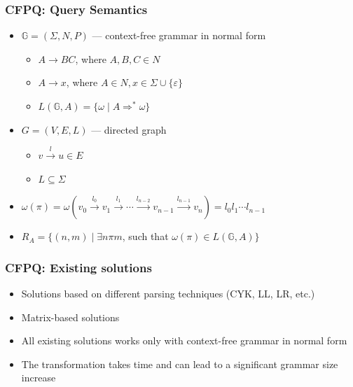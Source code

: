 \documentclass[xcolor=table]{beamer}
\begin{document}
  \begin{frame}[fragile]
    \frametitle{CFPQ: Query Semantics}
    \begin{itemize}
      \item $\mathbb{G} = (\Sigma, N, P)$ --- context-free grammar in normal form
      \begin{itemize}
        \item $A \rightarrow B C$, where $A, B, C \in N$
        \item $A \rightarrow x$, where $A \in N, x \in \Sigma \cup \{\varepsilon\}$
        \item $L(\mathbb{G},A) = \{ \omega \mid A \Rightarrow^* \omega \}$
      \end{itemize}
      \pause
      \item $G = (V,E,L)$ --- directed graph
        \begin{itemize}
          \item $v \xrightarrow{l} u \in E$
          \item $L \subseteq \Sigma$
        \end{itemize}
        \pause
      \item $\omega(\pi) = \omega(v_0 \xrightarrow{l_0} v_1 \xrightarrow{l_1} \cdots \xrightarrow{l_{n-2}} v_{n-1} \xrightarrow{l_{n-1}} v_n) = l_0 l_1 \cdots l_{n-1}$
      \pause
      \item $R_A = \{ (n, m) \mid \exists n \pi m$, such that $\omega(\pi) \in L(\mathbb{G},A)\}$
    \end{itemize}
  \end{frame}

  \begin{frame}[fragile] \frametitle{CFPQ: Existing solutions}
    	\begin{itemize}
    		\item Solutions based on different parsing techniques (CYK, LL, LR, etc.)
    		\pause
    		\item Matrix-based solutions
    		\pause
    		\item All existing solutions works only with context-free grammar in normal form
    		\pause
    		\item The transformation takes time and can lead to a significant grammar size increase
    		
    	\end{itemize}
  \end{frame}
\end{document}
